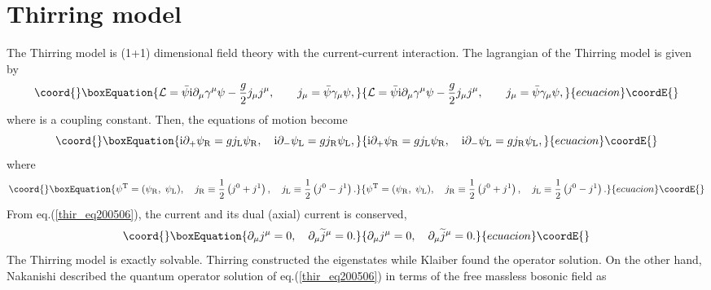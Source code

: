 \documentclass[a4paper,fleqn]{article}
\begin{document}
\section{Thirring model}
The Thirring model is (1+1) dimensional field theory with the current-current 
interaction. 
The lagrangian of the Thirring model is given by
\begin{equation}\coord{}\boxEquation{
{\cal L}= \bar\psi{\rm i} \partial_\mu \gamma^\mu \psi 
 -  \frac{g}{2} j_ \mu j^\mu, \quad \quad 
j_\mu = \bar\psi\gamma_\mu\psi,
}{
{\cal L}= \bar\psi{\rm i} \partial_\mu \gamma^\mu \psi 
 -  \frac{g}{2} j_ \mu j^\mu, \quad \quad 
j_\mu = \bar\psi\gamma_\mu\psi,
}{ecuacion}\coordE{}\end{equation}
where \coordHE{} is a coupling constant. Then, the equations of motion become
\begin{equation}\coord{}\boxEquation{
     {\rm i} \partial_+ \psi_{\rm R} = g j_{\rm L} \psi_{\rm R}, \quad
     {\rm i} \partial_- \psi_{\rm L} = g j_{\rm R} \psi_{\rm L},
\label{thir_eq200506}
}{
     {\rm i} \partial_+ \psi_{\rm R} = g j_{\rm L} \psi_{\rm R}, \quad
     {\rm i} \partial_- \psi_{\rm L} = g j_{\rm R} \psi_{\rm L},
}{ecuacion}\coordE{}\end{equation}
where
\begin{equation}\coord{}\boxEquation{
\psi^{\rm T} = (\psi_{\rm R},\;\psi_{\rm L}), \quad
j_{\rm R} \equiv \frac{1}{2} \left(j^0 + j^1 \right), \quad 
j_{\rm L} \equiv \frac{1}{2} \left(j^0 - j^1 \right).
}{
\psi^{\rm T} = (\psi_{\rm R},\;\psi_{\rm L}), \quad
j_{\rm R} \equiv \frac{1}{2} \left(j^0 + j^1 \right), \quad 
j_{\rm L} \equiv \frac{1}{2} \left(j^0 - j^1 \right).
}{ecuacion}\coordE{}\end{equation}
From eq.(\ref{thir_eq200506}), the current \coordHE{} and its dual (axial) current
\coordHE{} is conserved,
\begin{equation}\coord{}\boxEquation{
\partial_\mu j^\mu =0, \quad \partial_\mu \widetilde{j}^\mu = 0.
}{
\partial_\mu j^\mu =0, \quad \partial_\mu \widetilde{j}^\mu = 0.
}{ecuacion}\coordE{}\end{equation}
The Thirring model is exactly solvable.
Thirring \cite{thi58} constructed the eigenstates while
Klaiber \cite{kla67} found the operator solution.
On the other hand, Nakanishi \cite{nak77} described the quantum operator solution of 
eq.(\ref{thir_eq200506}) in terms of the free massless bosonic field 
\coordHE{} as
\end{document}
